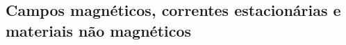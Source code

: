 \subsection{Campos magnéticos, correntes estacionárias e materiais não magnéticos}
\label{ssec:magnetism}